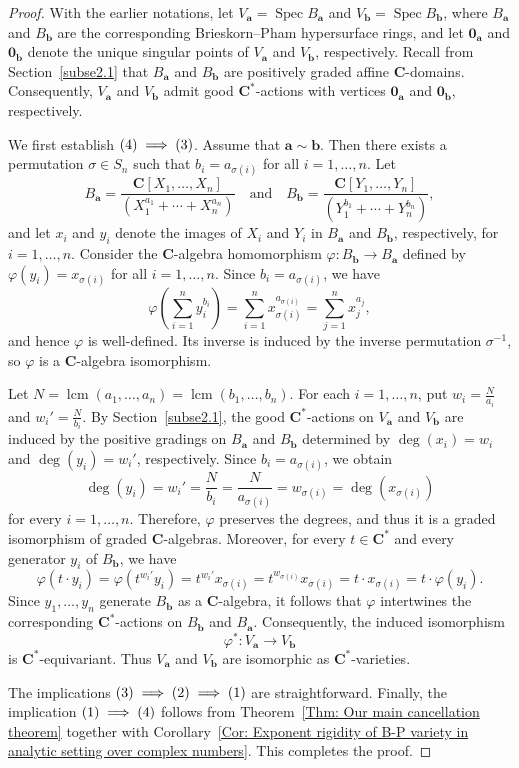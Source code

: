 \documentclass[10pt,a4paper]{amsart}
\numberwithin{equation}{section}
\numberwithin{figure}{section}
\numberwithin{equation}{section}
\newcommand{\C}{\mathbf{C}}
\newcommand{\oo}{\mathbf{0}}
\newcommand{\ba}{\mathbf{a}}
\newcommand{\bb}{\mathbf{b}}
\newcommand{\Spec}{\operatorname{Spec}}
\begin{document}
\begin{proof}
With the earlier notations, let $V_\ba=\Spec B_\ba$ and $V_\bb=\Spec B_\bb$, where $B_\ba$ and $B_\bb$ are the corresponding Brieskorn--Pham hypersurface rings, and let $\oo_\ba$ and $\oo_\bb$ denote the unique singular points of $V_\ba$ and $V_\bb$, respectively. Recall from Section~\ref{subse2.1} that $B_\ba$ and $B_\bb$ are positively graded affine $\C$-domains. Consequently, $V_\ba$ and $V_\bb$ admit good $\C^*$-actions with vertices $\oo_\ba$ and $\oo_\bb$, respectively.

We first establish $\textup{(4)}\implies\textup{(3)}$. Assume that $\ba\sim\bb$. Then there exists a permutation $\sigma\in S_n$ such that $b_i=a_{\sigma(i)}$ for all $i=1,\ldots,n$. Let
\[
B_\ba=
\frac{\C[X_1,\ldots,X_n]}
{(X_1^{a_1}+\cdots+X_n^{a_n})}
\quad\text{and}\quad
B_\bb=
\frac{\C[Y_1,\ldots,Y_n]}
{(Y_1^{b_1}+\cdots+Y_n^{b_n})},
\]
and let $x_i$ and $y_i$ denote the images of $X_i$ and $Y_i$ in $B_\ba$ and $B_\bb$, respectively, for $i=1,\ldots,n$. Consider the $\C$-algebra homomorphism $\varphi:B_\bb\longrightarrow B_\ba$
defined by $\varphi(y_i)=x_{\sigma(i)}$ for all $i=1,\ldots,n$. Since $b_i=a_{\sigma(i)}$, we have
\[
\varphi\!\left(\sum_{i=1}^{n}y_i^{b_i}\right)
=
\sum_{i=1}^{n}x_{\sigma(i)}^{a_{\sigma(i)}}
=
\sum_{j=1}^{n}x_j^{a_j},
\]
and hence $\varphi$ is well-defined. Its inverse is induced by the inverse permutation $\sigma^{-1}$, so $\varphi$ is a $\C$-algebra isomorphism.

Let $N=\operatorname{lcm}(a_1,\ldots,a_n) =
\operatorname{lcm}(b_1,\ldots,b_n)$. For each $i=1,\ldots,n$, put $w_i=\frac{N}{a_i}$ and $w_i'=\frac{N}{b_i}$. By Section~\ref{subse2.1}, the good $\C^*$-actions on $V_\ba$ and $V_\bb$ are induced by the positive gradings on $B_\ba$ and $B_\bb$ determined by $\deg(x_i)=w_i$ and $\deg(y_i)=w_i'$, respectively. Since $b_i=a_{\sigma(i)}$, we obtain 
\[
\deg(y_i)=w_i'=\frac{N}{b_i}=\frac{N}{a_{\sigma(i)}}=w_{\sigma(i)}=\deg(x_{\sigma(i)})
\]
for every $i=1,\ldots,n$. Therefore, $\varphi$ preserves the degrees, and thus it is a graded isomorphism of graded $\C$-algebras. Moreover, for every $t\in\C^*$ and every generator $y_i$ of $B_\bb$, we have
\[
\varphi(t\cdot y_i)=\varphi(t^{w_i'}y_i)=t^{w_i'}x_{\sigma(i)}=t^{w_{\sigma(i)}}x_{\sigma(i)}=t\cdot x_{\sigma(i)}=t\cdot\varphi(y_i).
\]
Since $y_1,\ldots,y_n$ generate $B_\bb$ as a $\C$-algebra, it follows that $\varphi$ intertwines the corresponding $\C^*$-actions on $B_\bb$ and $B_\ba$. Consequently, the induced isomorphism
\[
\varphi^*:V_\ba\longrightarrow V_\bb
\]
is $\C^*$-equivariant. Thus $V_\ba$ and $V_\bb$ are isomorphic as $\C^*$-varieties.

The implications $\rm(3)\implies\rm(2)\implies\rm(1)$ are straightforward. Finally, the implication $\textup{(1)}\implies\textup{(4)}$ follows from Theorem~\ref{Thm: Our main cancellation theorem} together with Corollary~\ref{Cor: Exponent rigidity of B-P variety in analytic setting over complex numbers}. This completes the proof.
\end{proof}
\end{document}
